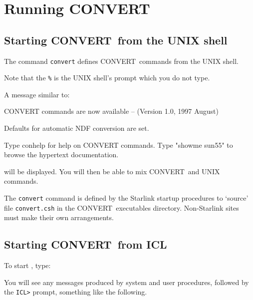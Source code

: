 \documentclass[twoside,11pt]{starlink}
\providecommand{\CONVERT}{{\footnotesize CONVERT}}
\providecommand{\BCONVERT}{{\normalsize CONVERT}}
\providecommand{\ICL}{{\footnotesize ICL}}
\providecommand{\ICLref}{\xref{\ICL}{sg5}{}}
\begin{document}
\newpage
\section[Running {\small \bf CONVERT}]{\label{running_convert}Running \BCONVERT}

\subsection[Starting {\small CONVERT} from the UNIX shell]
{
Starting \BCONVERT\ from the UNIX shell}

The command \texttt{convert} defines \CONVERT\ commands from
the UNIX shell.

\begin{terminalv}
\end{terminalv}

Note that the \texttt{\%} is the UNIX shell's prompt which you do not type.

A message similar to:

\begin{terminalv}

   CONVERT commands are now available -- (Version 1.0, 1997 August)

   Defaults for automatic NDF conversion are set.

   Type conhelp for help on CONVERT commands.
   Type "showme sun55" to browse the hypertext documentation.

\end{terminalv}

will be displayed. You will then be able to mix \CONVERT\ and UNIX commands.

The \texttt{convert} command is defined by the Starlink startup procedures to
`source' file \texttt{convert.csh} in the \CONVERT\ executables directory.
Non-Starlink sites must make their own arrangements.

\subsection[Starting {\small CONVERT} from {\small \bf ICL}]
{
Starting \BCONVERT\ from ICL}
To start \ICLref, type:

\begin{terminalv}
\end{terminalv}

You will see any messages produced by system and user procedures, followed
by the \texttt{ICL>} prompt, something like the following.
\end{document}

